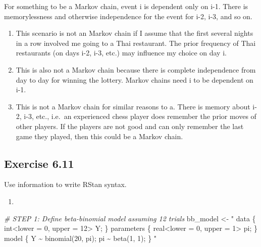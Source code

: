 \documentclass[
]{article}
\newenvironment{Shaded}{\begin{snugshade}}{\end{snugshade}}
\newcommand{\CommentTok}[1]{\textcolor[rgb]{0.56,0.35,0.01}{\textit{#1}}}
\newcommand{\NormalTok}[1]{#1}
\newcommand{\OtherTok}[1]{\textcolor[rgb]{0.56,0.35,0.01}{#1}}
\newcommand{\StringTok}[1]{\textcolor[rgb]{0.31,0.60,0.02}{#1}}
\providecommand{\tightlist}{%
  \setlength{\itemsep}{0pt}\setlength{\parskip}{0pt}}
\begin{document}
For something to be a Markov chain, event i is dependent only on i-1.
There is memorylessness and otherwise independence for the event for
i-2, i-3, and so on.

\begin{enumerate}
\def\labelenumi{\alph{enumi})}
\item
  This scenario is not an Markov chain if I assume that the first
  several nights in a row involved me going to a Thai restaurant. The
  prior frequency of Thai restaurants (on days i-2, i-3, etc.) may
  influence my choice on day i.
\item
  This is also not a Markov chain because there is complete independence
  from day to day for winning the lottery. Markov chains need i to be
  dependent on i-1.
\item
  This is not a Markov chain for similar reasons to a. There is memory
  about i-2, i-3, etc., i.e.~an experienced chess player does remember
  the prior moves of other players. If the players are not good and can
  only remember the last game they played, then this could be a Markov
  chain.
\end{enumerate}

\hypertarget{exercise-6.11}{%
\subsection{Exercise 6.11}\label{exercise-6.11}}

Use information to write RStan syntax.

\begin{enumerate}
\def\labelenumi{\alph{enumi})}
\tightlist
\item
\end{enumerate}

\begin{Shaded}
\begin{Highlighting}[]
\CommentTok{\# STEP 1: Define beta{-}binomial model assuming 12 trials }
\NormalTok{bb\_model }\OtherTok{\textless{}{-}} \StringTok{"}
\StringTok{  data \{}
\StringTok{    int\textless{}lower = 0, upper = 12\textgreater{} Y;}
\StringTok{  \}}
\StringTok{  parameters \{}
\StringTok{    real\textless{}lower = 0, upper = 1\textgreater{} pi;}
\StringTok{  \}}
\StringTok{  model \{}
\StringTok{    Y \textasciitilde{} binomial(20, pi);}
\StringTok{    pi \textasciitilde{} beta(1, 1);}
\StringTok{  \}}
\StringTok{  "}
\end{Highlighting}
\end{Shaded}
\end{document}
